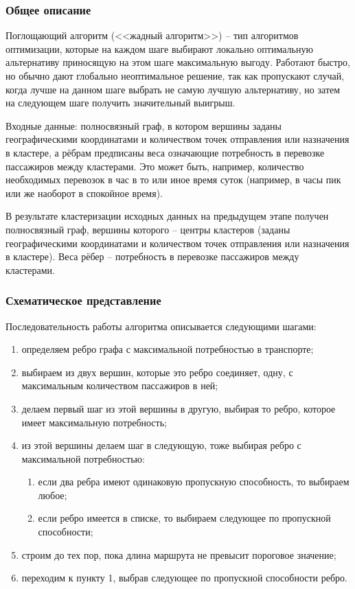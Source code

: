 \subsubsection{Общее описание}
Поглощающий алгоритм (<<жадный алгоритм>>) -- тип алгоритмов оптимизации, которые на каждом шаге выбирают 
локально оптимальную альтернативу приносящую на этом шаге максимальную выгоду. Работают быстро, но обычно 
дают глобально неоптимальное решение, так как пропускают случай, когда лучше на данном шаге выбрать не самую 
лучшую альтернативу, но затем на следующем шаге получить значительный выигрыш.

Входные данные: полносвязный граф, в котором вершины заданы географическими координатами и количеством 
точек отправления или назначения в кластере, а рёбрам предписаны веса означающие потребность в перевозке 
пассажиров между кластерами. Это может быть, например, количество необходимых перевозок в час в то или иное 
время суток (например, в часы пик или же наоборот в спокойное время).

В результате кластеризации исходных данных на предыдущем этапе получен полносвязный граф, вершины 
которого -- центры кластеров (заданы географическими координатами и количеством точек отправления или 
назначения в кластере). Веса рёбер -- потребность в перевозке пассажиров между кластерами. 

\subsubsection{Схематическое представление}
Последовательность работы алгоритма описывается следующими шагами:
\begin{enumerate}
    \item определяем ребро графа с максимальной потребностью в транспорте;
    \item выбираем из двух вершин, которые это ребро соединяет, одну, с максимальным количеством 
        пассажиров в ней;
    \item делаем первый шаг из этой вершины в другую, выбирая то ребро, которое имеет максимальную 
        потребность;
    \item из этой вершины делаем шаг в следующую, тоже выбирая ребро с максимальной потребностью:
    \begin{enumerate}
        \item если два ребра имеют одинаковую пропускную способность, то выбираем любое;
        \item если ребро имеется в списке, то выбираем следующее по пропускной способности;
    \end{enumerate}
    \item строим до тех пор, пока длина маршрута не превысит пороговое значение;
    \item переходим к пункту 1, выбрав следующее по пропускной способности ребро.
\end{enumerate}

